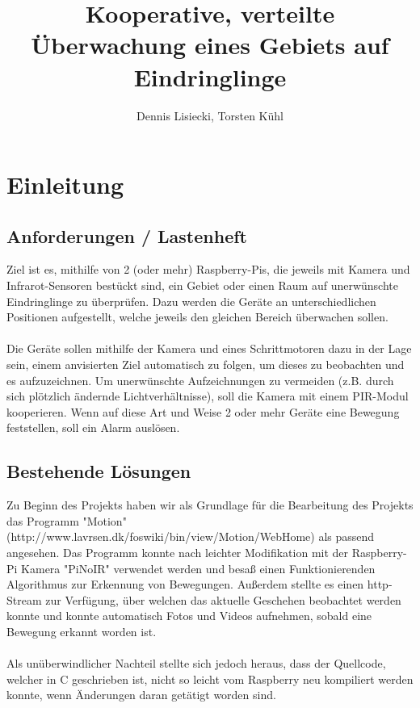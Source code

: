 \documentclass[12pt,a4paper]{scrreprt}
\title{Kooperative, verteilte Überwachung eines Gebiets auf Eindringlinge}
\author{Dennis Lisiecki, Torsten Kühl}
\begin{document}
\maketitle	%
\tableofcontents	%

\chapter{Einleitung}
\section{Anforderungen / Lastenheft}
Ziel ist es, mithilfe von 2 (oder mehr) Raspberry-Pis, die jeweils mit Kamera und Infrarot-Sensoren bestückt sind, ein Gebiet oder einen Raum auf unerwünschte Eindringlinge zu überprüfen. 
Dazu werden die Geräte an unterschiedlichen Positionen aufgestellt, welche jeweils den gleichen Bereich überwachen sollen. 
\\
\\
Die Geräte sollen mithilfe der Kamera und eines Schrittmotoren dazu in der Lage sein, einem anvisierten Ziel automatisch zu folgen, um dieses zu beobachten und es aufzuzeichnen. Um unerwünschte Aufzeichnungen zu vermeiden (z.B. durch sich plötzlich ändernde Lichtverhältnisse), soll die Kamera mit einem PIR-Modul kooperieren.
Wenn auf diese Art und Weise 2 oder mehr Geräte eine Bewegung feststellen, soll ein Alarm auslösen.



\section{Bestehende Lösungen}

Zu Beginn des Projekts haben wir als Grundlage für die Bearbeitung des Projekts das Programm "Motion" (http://www.lavrsen.dk/foswiki/bin/view/Motion/WebHome) als passend angesehen. Das Programm konnte nach leichter Modifikation mit der Raspberry-Pi Kamera "PiNoIR" verwendet werden und besaß einen Funktionierenden Algorithmus zur Erkennung von Bewegungen. Außerdem stellte es einen http-Stream zur Verfügung, über welchen das aktuelle Geschehen beobachtet werden konnte und konnte automatisch Fotos und Videos aufnehmen, sobald eine Bewegung erkannt worden ist.
\\\\
Als unüberwindlicher Nachteil stellte sich jedoch heraus, dass der Quellcode, welcher in C geschrieben ist, nicht so leicht vom Raspberry neu kompiliert werden konnte, wenn Änderungen daran getätigt worden sind.
\\\\
\end{document}
